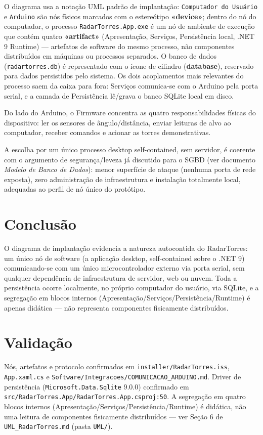 O diagrama usa a notação UML padrão de implantação: \texttt{Computador do Usuário} e
\texttt{Arduino} são nós físicos marcados com o estereótipo \textbf{«device»}; dentro do nó do
computador, o processo \texttt{RadarTorres.App.exe} é um nó de ambiente de execução que contém
quatro \textbf{«artifact»} (Apresentação, Serviços, Persistência local, .NET 9 Runtime) ---
artefatos de software do mesmo processo, não componentes distribuídos em máquinas ou processos
separados. O banco de dados (\texttt{radartorres.db}) é representado com o ícone de cilindro
(\textbf{database}), reservado para dados persistidos pelo sistema. Os dois acoplamentos mais
relevantes do processo saem da caixa para fora: Serviços comunica-se com o Arduino pela porta
serial, e a camada de Persistência lê/grava o banco SQLite local em disco.

Do lado do Arduino, o Firmware concentra as quatro responsabilidades físicas do dispositivo: ler
os sensores de ângulo/distância, enviar leituras de alvo ao computador, receber comandos e
acionar as torres demonstrativas.

A escolha por um único processo desktop self-contained, sem servidor, é coerente com o argumento
de segurança/leveza já discutido para o SGBD (ver documento \emph{Modelo de Banco de Dados}):
menor superfície de ataque (nenhuma porta de rede exposta), zero administração de infraestrutura
e instalação totalmente local, adequadas ao perfil de nó único do protótipo.

\section{Conclusão}

O diagrama de implantação evidencia a natureza autocontida do RadarTorres: um único nó de
software (a aplicação desktop, self-contained sobre o .NET 9) comunicando-se com um único
microcontrolador externo via porta serial, sem qualquer dependência de infraestrutura de
servidor, web ou nuvem. Toda a persistência ocorre localmente, no próprio computador do usuário,
via SQLite, e a segregação em blocos internos (Apresentação/Serviços/Persistência/Runtime) é
apenas didática --- não representa componentes fisicamente distribuídos.

\section{Validação}

Nós, artefatos e protocolo confirmados em \texttt{installer/RadarTorres.iss},
\texttt{App.xaml.cs} e \texttt{Software/Integracoes/COMUNICACAO\_ARDUINO.md}. Driver de persistência
(\texttt{Microsoft.Data.Sqlite} 9.0.0) confirmado em
\texttt{src/RadarTorres.App/RadarTorres.App.csproj:50}. A segregação em quatro blocos internos
(Apresentação/Serviços/Persistência/Runtime) é didática, não uma leitura de componentes
fisicamente distribuídos --- ver Seção 6 de \texttt{UML\_RadarTorres.md} (pasta \texttt{UML/}).
